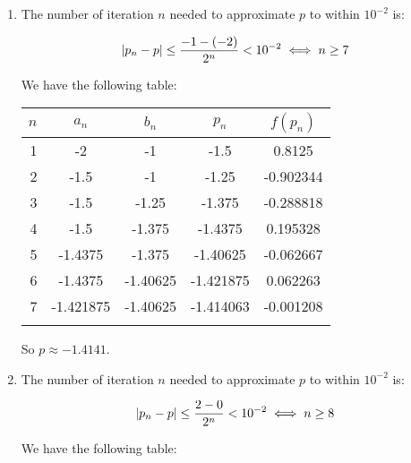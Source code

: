 \documentclass[../../Assignments.tex]{subfiles}
\begin{document}
\begin{solution}
    \begin{enumerate}[label=(\alph*)]
        \item The number of iteration \(n\) needed to approximate \(p\) to
            within \(10^{-2}\) is:

            \[\abs{p_n - p} \leq \frac{-1 - (-2)}{2^n} < 10^{-2} \iff n \geq 7\]

            We have the following table:

            \begin{tabular}{r S[table-format=-1.5] S[table-format=-1.5] S[table-format=-1.6] S[table-format=-1.6]}
                \\
                \toprule
                \(n\)  &  {\(a_n\)}  &  {\(b_n\)}  &  {\(p_n\)}  &  {\(f(p_n)\)}  \\
                  &  -2         &  -1         &  -1.5       &   0.8125       \\
                    2  &  -1.5       &  -1         &  -1.25      &  -0.902344     \\
                    3  &  -1.5       &  -1.25      &  -1.375     &  -0.288818     \\
                    4  &  -1.5       &  -1.375     &  -1.4375    &   0.195328     \\
                    5  &  -1.4375    &  -1.375     &  -1.40625   &  -0.062667     \\
                    6  &  -1.4375    &  -1.40625   &  -1.421875  &   0.062263     \\
                    7  &  -1.421875  &  -1.40625   &  -1.414063  &  -0.001208     \\
                \bottomrule
                \\
            \end{tabular}

            So \(p \approx \num{-1.4141}\).

        \item The number of iteration \(n\) needed to approximate \(p\) to
            within \(10^{-2}\) is:

            \[\abs{p_n - p} \leq \frac{2 - 0}{2^n} < 10^{-2} \iff n \geq 8\]

            We have the following table:


\end{enumerate}
\end{solution}
\end{document}
